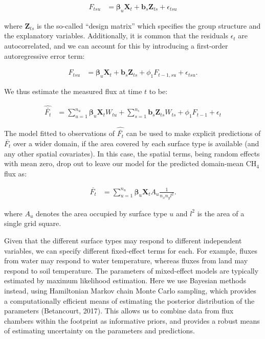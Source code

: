 \begin{align}
   \label{eq:lmerModel_ust} 
  F_{tsu} &= \boldsymbol{\beta}_u \mathbf{X}_t + \mathbf{b}_s \mathbf{Z}_{ts} + \epsilon_{tsu}

\end{align}

where \(\mathbf{Z}_{ts}\) is the so-called ``design matrix'' which
specifies the group structure and the explanatory variables.
Additionally, it is common that the residuals \(\epsilon_{t}\) are
autocorrelated, and we can account for this by introducing a first-order
autoregressive error term:

\begin{align}
   \label{eq:lmerModel_ar_ust} 
  F_{tsu} &= \boldsymbol{\beta}_u \mathbf{X}_t + \mathbf{b}_s \mathbf{Z}_{ts} + \phi_{1}F_{t-1,su} + \epsilon_{tsu}.

\end{align}

We thus estimate the measured flux at time \(t\) to be:

\begin{align}
   \label{eq:pred_Fbarhat} 
  \widehat{\bar{F_t}} &= \sum_{u = 1}^{n_u} \boldsymbol{\beta}_u \mathbf{X}_t W_{tu} 
                       + \sum_{s = 1}^{n_s} \mathbf{b}_s \mathbf{Z}_{ts} W_{ts} 
                       + \phi_{1}F_{t-1} + \epsilon_{t}  

\end{align}

The model fitted to observations of \(\widehat{\bar{F_t}}\) can be used
to make explicit predictions of \(\bar{F_t}\) over a wider domain, if
the area covered by each surface type is available (and any other
spatial covariates). In this case, the spatial terms, being random
effects with mean zero, drop out to leave our model for the predicted
domain-mean CH\(_4\) flux as:

\begin{align}
   \label{eq:pred_Fbar} 
  \bar{F_t} &= \sum_{u = 1}^{n_u} \boldsymbol{\beta}_u \mathbf{X}_t A_{u} \frac{1}{n_x n_y l^2}.

\end{align}

where \(A_{u}\) denotes the area occupied by surface type \(u\) and
\(l^2\) is the area of a single grid square.

Given that the different surface types may respond to different
independent variables, we can specify different fixed-effect terms for
each. For example, fluxes from water may respond to water temperature,
whereas fluxes from land may respond to soil temperature. The parameters
of mixed-effect models are typically estimated by maximum likelihood
estimation. Here we use Bayesian methods instead, using Hamiltonian
Markov chain Monte Carlo sampling, which provides a computationally
efficient means of estimating the posterior distribution of the
parameters (Betancourt, 2017). This allows us to combine data from flux
chambers within the footprint as informative priors, and provides a
robust means of estimating uncertainty on the parameters and
predictions.

